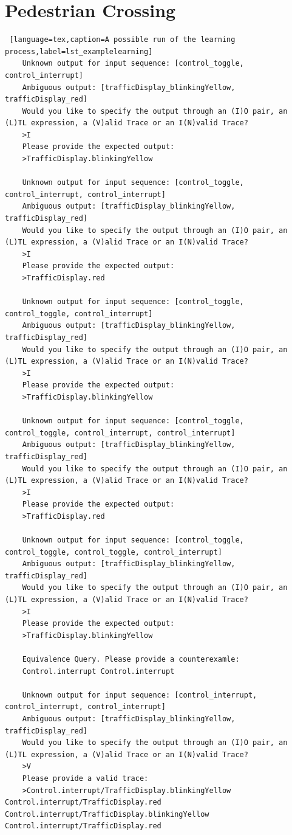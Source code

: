 \chapter{Pedestrian Crossing}
\bigskip
\begin{lstlisting} [language=tex,caption=A possible run of the learning process,label=lst_examplelearning]
	Unknown output for input sequence: [control_toggle, control_interrupt]
	Ambiguous output: [trafficDisplay_blinkingYellow, trafficDisplay_red]
	Would you like to specify the output through an (I)O pair, an (L)TL expression, a (V)alid Trace or an I(N)valid Trace?
	>I
	Please provide the expected output:
	>TrafficDisplay.blinkingYellow
	
	Unknown output for input sequence: [control_toggle, control_interrupt, control_interrupt]
	Ambiguous output: [trafficDisplay_blinkingYellow, trafficDisplay_red]
	Would you like to specify the output through an (I)O pair, an (L)TL expression, a (V)alid Trace or an I(N)valid Trace?
	>I
	Please provide the expected output:
	>TrafficDisplay.red
	
	Unknown output for input sequence: [control_toggle, control_toggle, control_interrupt]
	Ambiguous output: [trafficDisplay_blinkingYellow, trafficDisplay_red]
	Would you like to specify the output through an (I)O pair, an (L)TL expression, a (V)alid Trace or an I(N)valid Trace?
	>I
	Please provide the expected output:
	>TrafficDisplay.blinkingYellow
	
	Unknown output for input sequence: [control_toggle, control_toggle, control_interrupt, control_interrupt]
	Ambiguous output: [trafficDisplay_blinkingYellow, trafficDisplay_red]
	Would you like to specify the output through an (I)O pair, an (L)TL expression, a (V)alid Trace or an I(N)valid Trace?
	>I
	Please provide the expected output:
	>TrafficDisplay.red
	
	Unknown output for input sequence: [control_toggle, control_toggle, control_toggle, control_interrupt]
	Ambiguous output: [trafficDisplay_blinkingYellow, trafficDisplay_red]
	Would you like to specify the output through an (I)O pair, an (L)TL expression, a (V)alid Trace or an I(N)valid Trace?
	>I
	Please provide the expected output:
	>TrafficDisplay.blinkingYellow
	
	Equivalence Query. Please provide a counterexamle:
	Control.interrupt Control.interrupt
	
	Unknown output for input sequence: [control_interrupt, control_interrupt, control_interrupt]
	Ambiguous output: [trafficDisplay_blinkingYellow, trafficDisplay_red]
	Would you like to specify the output through an (I)O pair, an (L)TL expression, a (V)alid Trace or an I(N)valid Trace?
	>V
	Please provide a valid trace:
	>Control.interrupt/TrafficDisplay.blinkingYellow Control.interrupt/TrafficDisplay.red Control.interrupt/TrafficDisplay.blinkingYellow Control.interrupt/TrafficDisplay.red
	

\end{lstlisting}
